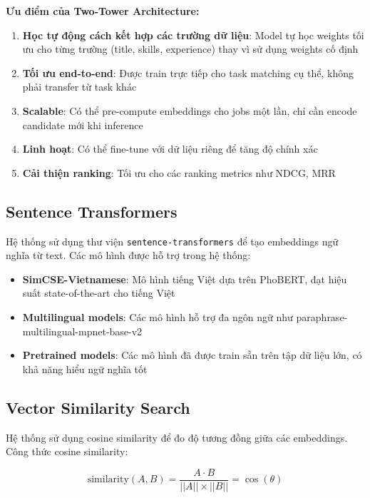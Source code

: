 \textbf{Ưu điểm của Two-Tower Architecture:}

\begin{enumerate}
    \item \textbf{Học tự động cách kết hợp các trường dữ liệu}: Model tự học weights tối ưu cho từng trường (title, skills, experience) thay vì sử dụng weights cố định
    \item \textbf{Tối ưu end-to-end}: Được train trực tiếp cho task matching cụ thể, không phải transfer từ task khác
    \item \textbf{Scalable}: Có thể pre-compute embeddings cho jobs một lần, chỉ cần encode candidate mới khi inference
    \item \textbf{Linh hoạt}: Có thể fine-tune với dữ liệu riêng để tăng độ chính xác
    \item \textbf{Cải thiện ranking}: Tối ưu cho các ranking metrics như NDCG, MRR
\end{enumerate}

\subsection{Sentence Transformers}

Hệ thống sử dụng thư viện \texttt{sentence-transformers} để tạo embeddings ngữ nghĩa từ text. Các mô hình được hỗ trợ trong hệ thống:

\begin{itemize}
    \item \textbf{SimCSE-Vietnamese}: Mô hình tiếng Việt dựa trên PhoBERT, đạt hiệu suất state-of-the-art cho tiếng Việt
    \item \textbf{Multilingual models}: Các mô hình hỗ trợ đa ngôn ngữ như paraphrase-multilingual-mpnet-base-v2
    \item \textbf{Pretrained models}: Các mô hình đã được train sẵn trên tập dữ liệu lớn, có khả năng hiểu ngữ nghĩa tốt
\end{itemize}

\subsection{Vector Similarity Search}

Hệ thống sử dụng cosine similarity để đo độ tương đồng giữa các embeddings. Công thức cosine similarity:

\begin{equation}
\text{similarity}(A, B) = \frac{A \cdot B}{||A|| \times ||B||} = \cos(\theta)
\end{equation}

